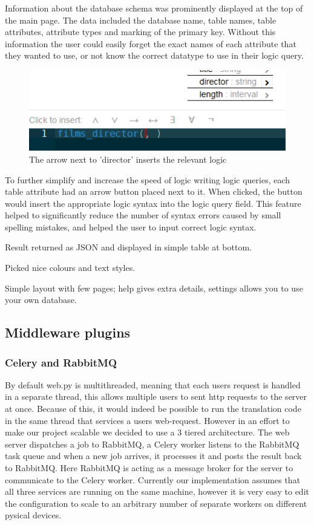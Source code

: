 \documentclass[a4paper, 11pt]{article}
\begin{document}
      Information about the database schema was prominently displayed at the top
      of the main page. The data included the database name, table names, table
      attributes, attribute types and marking of the primary key. Without this
      information the user could easily forget the exact names of each attribute
      that they wanted to use, or not know the correct datatype to use in their
      logic query.

      \begin{figure}[h!]
        \centering
        \includegraphics[]{images/InsertLogic.png}
        \caption{The arrow next to 'director' inserts the relevant logic}
      \end{figure}

      To further simplify and increase the speed of logic writing logic queries,
      each table attribute had an arrow button placed next to it. When clicked,
      the button would insert the appropriate logic syntax into the logic query
      field. This feature helped to significantly reduce the number of syntax
      errors caused by small spelling mistakes, and helped the user to input
      correct logic syntax.

      Result returned as JSON and displayed in simple table at bottom.

      Picked nice colours and text styles.

      Simple layout with few pages; help gives extra details, settings allows
      you to use your own database.
 

  \subsection{Middleware plugins}
    \subsubsection{Celery and RabbitMQ}
      By default web.py is multithreaded, meaning that each users request is
      handled in a separate thread, this allows multiple users to sent http
      requests to the server at once. Because of this, it would indeed be
      possible to run the translation code in the same thread that services 
      a users web-request. However in an effort to make our project scalable we
      decided to use a 3 tiered architecture. The web server dispatches a job to
      RabbitMQ, a Celery worker listens to the RabbitMQ task queue and when a
      new job arrives, it processes it and posts the result back to RabbitMQ.
      Here RabbitMQ is acting as a message broker for the server to communicate
      to the Celery worker. Currently our implementation assumes that all three
      services are running on the same machine, however it is very easy to edit
      the configuration to scale to an arbitrary number of separate workers on
      different pysical devices.
\end{document}
